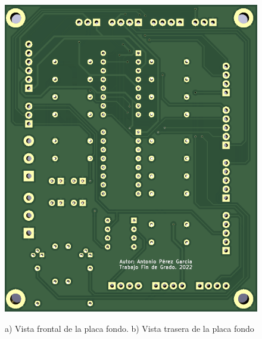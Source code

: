 \begin{figure}[htpb]
{        \includegraphics[scale=0.29]{03-placa/fondotras.png}
    }
    \caption{a) Vista frontal de la placa fondo. b) Vista trasera de la placa fondo}
    \label{fig:placafondo} 
    \end{figure} 
